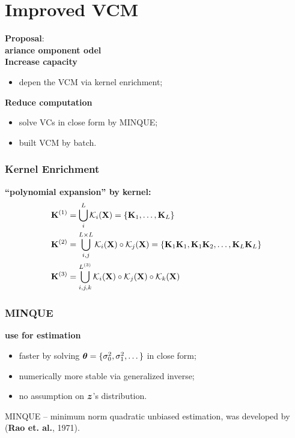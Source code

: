 \documentclass{beamer}
\newcommand{\kn}{\mathcal{K}} %
\begin{document}
\section{Improved VCM}
\begin{frame}
  \large{\textbf{Proposal}}: \\
  \large{\textbf{ ariance omponent odel}} \\
  \textbf{Increase capacity}
  \begin{itemize}
  \item depen the VCM via kernel enrichment;
  \end{itemize}
  \textbf{Reduce computation}
  \begin{itemize}
  \item solve VCs in close form by MINQUE;
  \item built VCM by batch.
  \end{itemize}
\end{frame}
\begin{frame}%
  \frametitle{Kernel Enrichment}
  \textbf{``polynomial expansion'' by kernel:}
  \begin{align*}
    \xk^{(1)} & = \bigcup_{i}^L \kn_i(\xx) = \{\xk_1, \dots, \xk_L\} \\
    \xk^{(2)} & = \bigcup_{i,j}^{L \times L} \kn_i(\xx) \circ \kn_j(\xx) = \{\xk_1\xk_1, \xk_1\xk_2, \dots, \xk_L\xk_L\} \\
    \xk^{(3)} & = \bigcup_{i,j,k}^{L^{(3)}}  \kn_i(\xx) \circ \kn_j(\xx) \circ \kn_k(\xx)
  \end{align*}
\end{frame}
\begin{frame} %
  \frametitle{MINQUE} %
  \textbf{use  for estimation}
  \begin{itemize}
  \item faster by solving ${\bm{\theta}}=\{\sigma_0^2, \sigma_1^2, \dots \}$
    in close form;
  \item numerically more stable via generalized inverse;
  \item no assumption on ${\bm{z}}$'s distribution.
  \end{itemize}
  MINQUE -- minimum norm quadratic unbiased estimation, was developed
  by (\textbf{Rao et. al.}, 1971).
\end{frame}
\end{document}
